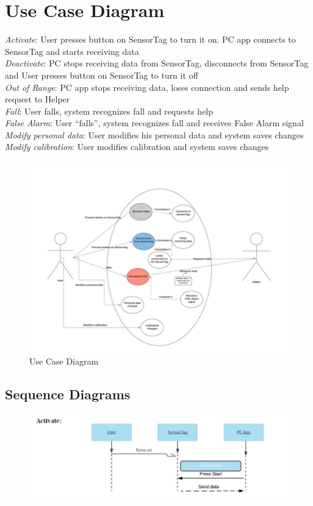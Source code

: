 \documentclass[conference,12pt]{IEEETran}
\begin{document}
\section{Use Case Diagram}
\textit{Activate}: User presses button on SensorTag to turn it on. PC app connects to SensorTag and starts receiving data\\
\textit{Deactivate}: PC stops receiving data from SensorTag, disconnects from SensorTag and User presses button on SensorTag to turn it off\\
\textit{Out of Range}: PC app stops receiving data, loses connection and sends help request to Helper\\
\textit{Fall}: User falls, system recognizes fall and requests help\\
\textit{False Alarm}: User “falls”, system recognizes fall and receives False Alarm signal\\
\textit{Modify personal data}: User modifies his personal data and system saves changes\\
\textit{Modify calibration}:  User modifies calibration and system saves changes\\
\FloatBarrier
\begin{figure}[!h]
	\centering
	\includegraphics[scale=0.8]{images/Use_Case_Diag.png}
	\caption{Use Case Diagram}
	\label{img:Use_Diag}
\end{figure}
\FloatBarrier

\subsection{Sequence Diagrams}

\FloatBarrier
\begin{figure}[!h]
	\centering
	\includegraphics[scale=0.4]{images/Seq_Activate.png}
	\label{img:activate}
\end{figure}
\FloatBarrier
\end{document}
